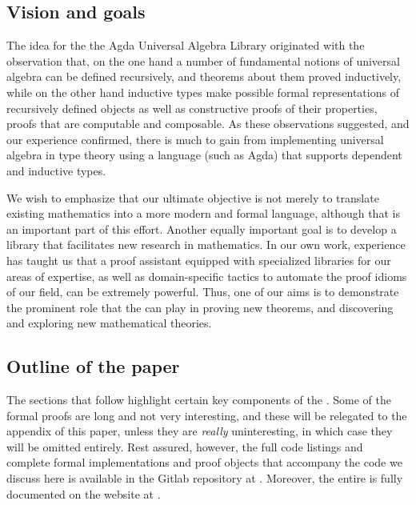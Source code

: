 \documentclass[a4paper,USenglish,cleveref,autoref,thm-restate]{lipics-v2019}
\begin{document}
\subsection{Vision and goals}\label{sec:vision-and-goals}
The idea for the the Agda Universal Algebra Library originated with the observation that, on the one hand a number of fundamental notions of universal algebra can be defined recursively, and theorems about them proved inductively, while on the other hand inductive types make possible formal representations of recursively defined objects as well as constructive proofs of their properties, proofs that are computable and composable. As these observations suggested, and our experience confirmed, there is much to gain from implementing universal algebra in type theory using a language (such as Agda) that supports dependent and inductive types.

We wish to emphasize that our ultimate objective is not merely to translate existing mathematics into a more modern and formal language, although that is an important part of this effort.  Another equally important goal is to develop a library that facilitates new research in mathematics. In our own work, experience has taught us that a proof assistant equipped with specialized libraries for our areas of expertise, as well as domain-specific tactics to automate the proof idioms of our field, can be extremely powerful.  Thus, one of our aims is to demonstrate the prominent role that the \agdaualib can play in proving new theorems, and discovering and exploring new mathematical theories.

\subsection{Outline of the paper}
The sections that follow highlight certain key components of the \agdaualib. Some of the formal proofs are long and not very interesting, and these will be relegated to the appendix of this paper, unless they are \emph{really} uninteresting, in which case they will be omitted entirely.  Rest assured, however, the full code listings and complete formal implementations and proof objects that accompany the code we discuss here is available in the \agdaualib Gitlab repository at \ualibgitlabio.  Moreover, the entire \agdaualib is fully documented on the website at \agdaualibdoc.
\end{document}
